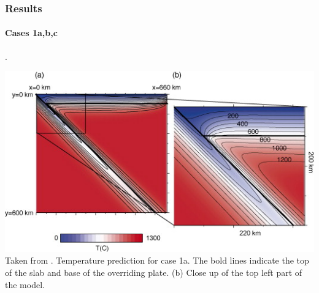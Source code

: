 \subsubsection*{Results}


\paragraph{Cases 1a,b,c}. 

\begin{center}
\includegraphics[width=14cm]{python_codes/fieldstone_68/images/fig2}\\
{\captionfont Taken from \cite{vack08}. Temperature prediction for case 1a. 
The bold lines indicate the top of the slab and base of the overriding plate. 
(b) Close up of the top left part of the model.}
\end{center}


